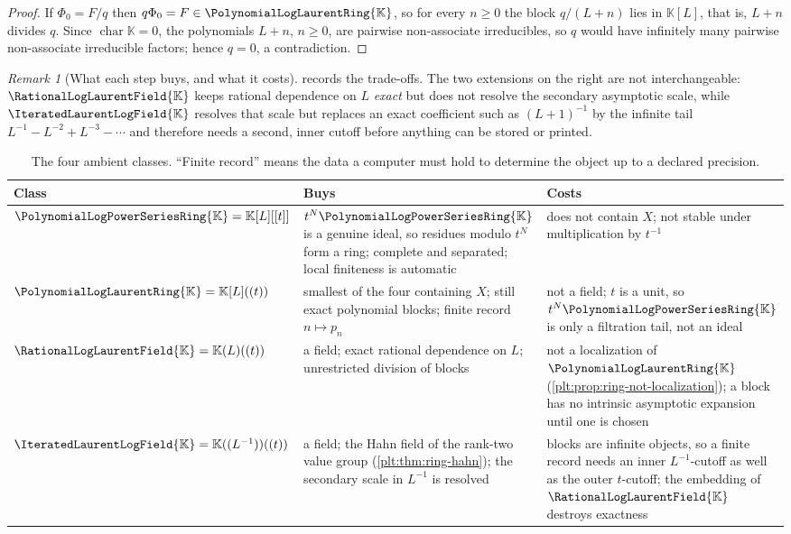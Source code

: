 \documentclass[11pt,oneside]{article}
\theoremstyle{plain}
\theoremstyle{definition}
\theoremstyle{remark}
\newtheorem{remark}[theorem]{Remark}
\newcommand{\K}{\mathbb{K}}
\newcommand{\PLpow}{\PolynomialLogPowerSeriesRing{\K}}   %
\newcommand{\PLlau}{\PolynomialLogLaurentRing{\K}}       %
\newcommand{\PLrat}{\RationalLogLaurentField{\K}}        %
\newcommand{\PLit}{\IteratedLaurentLogField{\K}}         %
\begin{document}
\begin{proof}
If \(\Phi_0=F/q\) then \(q\Phi_0=F\in\PLlau\), so for every \(n\ge0\) the
block \(q/(L+n)\) lies in \(\K[L]\), that is, \(L+n\) divides \(q\).  Since
\(\operatorname{char}\K=0\), the polynomials \(L+n\), \(n\ge0\), are pairwise
non-associate irreducibles, so \(q\) would have infinitely many pairwise
non-associate irreducible factors; hence \(q=0\), a contradiction.
\end{proof}

\begin{remark}[What each step buys, and what it costs]
\label{plt:rmk:ring-tradeoffs}
 records the trade-offs.  The two extensions on
the right are not interchangeable: \(\PLrat\) keeps rational dependence on
\(L\) \emph{exact} but does not resolve the secondary asymptotic scale, while
\(\PLit\) resolves that scale but replaces an exact coefficient such as
\((L+1)^{-1}\) by the infinite tail
\(L^{-1}-L^{-2}+L^{-3}-\cdots\) and therefore needs a second, inner cutoff
before anything can be stored or printed.
\end{remark}

\begin{table}[htbp]
\centering
\small
\caption{The four ambient classes.  ``Finite record'' means the data a
computer must hold to determine the object up to a declared precision.}
\label{plt:tab:ring-tradeoffs}
\begin{tabular}{@{}lp{}p{}@{}}
\hline
Class & Buys & Costs \\
\hline
\(\PLpow=\K[L][[t]]\)
 & \(t^N\PLpow\) is a genuine ideal, so residues modulo \(t^N\) form a ring;
   complete and separated; local finiteness is automatic
 & does not contain \(X\); not stable under multiplication by \(t^{-1}\) \\
\(\PLlau=\K[L]((t))\)
 & smallest of the four containing \(X\); still exact polynomial blocks;
   finite record \(n\mapsto p_n\)
 & not a field; \(t\) is a unit, so \(t^N\PLpow\) is only a filtration tail,
   not an ideal \\
\(\PLrat=\K(L)((t))\)
 & a field; exact rational dependence on \(L\); unrestricted division of
   blocks
 & not a localization of \(\PLlau\)
   (\cref{plt:prop:ring-not-localization}); a block has no intrinsic
   asymptotic expansion until one is chosen \\
\(\PLit=\K((L^{-1}))((t))\)
 & a field; the Hahn field of the rank-two value group
   (\cref{plt:thm:ring-hahn}); the secondary scale in \(L^{-1}\) is resolved
 & blocks are infinite objects, so a finite record needs an inner
   \(L^{-1}\)-cutoff as well as the outer \(t\)-cutoff; the embedding of
   \(\PLrat\) destroys exactness \\
\hline
\end{tabular}
\end{table}
\end{document}
